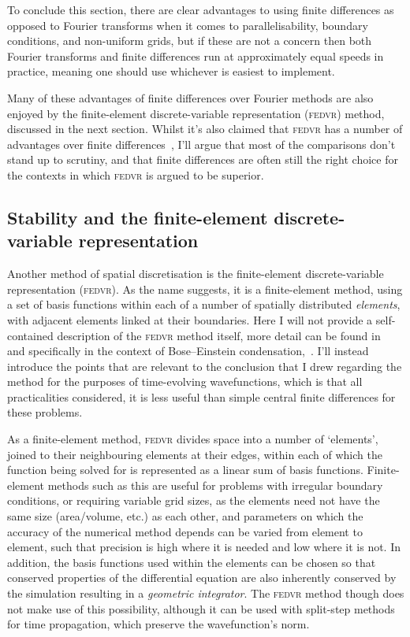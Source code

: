 To conclude this section, there are clear advantages to using finite differences as opposed to Fourier transforms when it comes to parallelisability, boundary conditions, and non-uniform grids, but if these are not a concern then both Fourier transforms and finite differences run at approximately equal speeds in practice, meaning one should use whichever is easiest to implement.

Many of these advantages of finite differences over Fourier methods are also enjoyed by the finite-element discrete-variable representation (\textsc{fedvr}) method, discussed in the next section. Whilst it's also claimed that \textsc{fedvr} has a number of advantages over finite differences~\cite{schneider_discrete_2005,schneider_parallel_2006}, I'll argue that most of the comparisons don't stand up to scrutiny, and that finite differences are often still the right choice for the contexts in which \textsc{fedvr} is argued to be superior.

\subsection{Stability and the finite-element discrete-variable representation}\label{sec:fedvr}

Another method of spatial discretisation is the finite-element discrete-variable representation (\textsc{fedvr}). As the name suggests, it is a finite-element method, using a set of basis functions within each of a number of spatially distributed \emph{elements}, with adjacent elements linked at their boundaries. Here I will not provide a self-contained description of the \textsc{fedvr} method itself, more detail can be found in~\cite[p.~285]{tannor_introduction_2007} and specifically in the context of Bose--Einstein condensation,~\cite{schneider_discrete_2005,schneider_parallel_2006}. I'll instead introduce the points that are relevant to the conclusion that I drew regarding the method for the purposes of time-evolving wavefunctions, which is that all practicalities considered, it is less useful than simple central finite differences for these problems.

As a finite-element method, \textsc{fedvr} divides space into a number of `elements', joined to their neighbouring elements at their edges, within each of which the function being solved for is represented as a linear sum of basis functions. Finite-element methods such as this are useful for problems with irregular boundary conditions, or requiring variable grid sizes, as the elements need not have the same size (area/volume, etc.) as each other, and parameters on which the accuracy of the numerical method depends can be varied from element to element, such that precision is high where it is needed and low where it is not. In addition, the basis functions used within the elements can be chosen so that conserved properties of the differential equation are also inherently conserved by the simulation resulting in a \emph{geometric integrator}. The \textsc{fedvr} method though does not make use of this possibility, although it can be used with split-step methods for time propagation, which preserve the wavefunction's norm.

